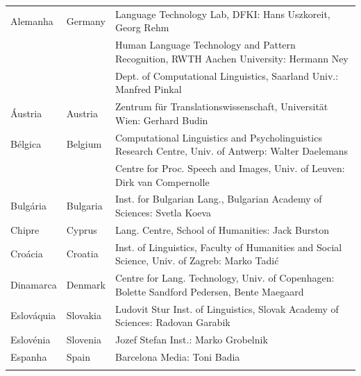 \cleardoublepage

\appendix
{}



  
\cleardoublepage

\label{metanetmembers}

\small
\begin{longtable}{llp{105mm}}
  Alemanha & \textcolor{grey1}{Germany} & Language Technology Lab, DFKI: Hans Uszkoreit, Georg Rehm\\ \addlinespace
  & & Human Language Technology and Pattern Recognition, RWTH Aachen University: Hermann Ney \\ \addlinespace
  & & Dept. of Computational Linguistics, Saarland Univ.: Manfred Pinkal \\ \addlinespace 
  Áustria & \textcolor{grey1}{Austria} & Zentrum für Translationswissenschaft, Universität Wien: Gerhard Budin \\ \addlinespace 
  Bélgica & \textcolor{grey1}{Belgium} & Computational Linguistics and Psycholinguistics Research Centre, Univ. of Antwerp: Walter Daelemans \\ \addlinespace
  & & Centre for Proc. Speech and Images, Univ. of Leuven: Dirk van Compernolle \\ \addlinespace
  Bulgária & \textcolor{grey1}{Bulgaria} & Inst. for Bulgarian Lang., Bulgarian Academy of Sciences: Svetla Koeva \\ \addlinespace
  Chipre & \textcolor{grey1}{Cyprus} & Lang. Centre, School of Humanities: Jack Burston \\ \addlinespace
  Croácia & \textcolor{grey1}{Croatia} & Inst. of Linguistics, Faculty of Humanities and Social Science, Univ. of Zagreb: Marko Tadić \\ \addlinespace
  Dinamarca &  \textcolor{grey1}{Denmark} & Centre for Lang. Technology, Univ. of Copenhagen: Bolette Sandford Pedersen, Bente Maegaard \\ \addlinespace
  Eslováquia & \textcolor{grey1}{Slovakia} & Ludovit Stur Inst. of Linguistics, Slovak Academy of Sciences: Radovan Garabik \\ \addlinespace 
  Eslovénia & \textcolor{grey1}{Slovenia} & Jozef Stefan Inst.: Marko Grobelnik \\ \addlinespace 
  Espanha & \textcolor{grey1}{Spain} & Barcelona Media: Toni Badia \\ \addlinespace 

\end{longtable}
